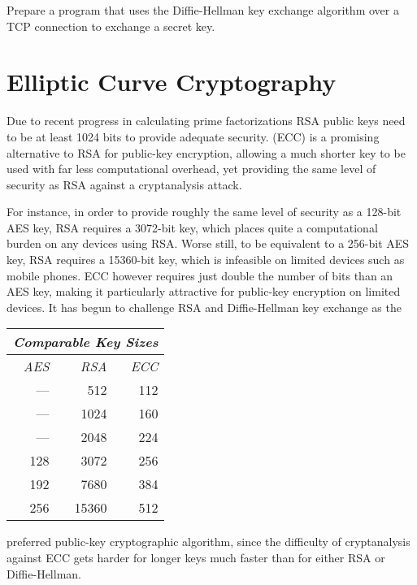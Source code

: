 \begin{exercise}
Prepare a program that uses the Diffie-Hellman key exchange algorithm over a
TCP connection to exchange a secret key.
\end{exercise}



\section{Elliptic Curve Cryptography}\label{Se:EllipticCurveCryptography}
Due to recent progress in calculating prime factorizations RSA public keys
need to be at least 1024 bits to provide adequate security.
 (ECC) is a promising alternative
to RSA for public-key encryption, allowing a much shorter key to be used
with far less computational overhead, yet providing the same level of security
as RSA against a cryptanalysis attack.

\noindent
\begin{minipage}{95mm}
  For instance, in order to provide roughly the same level of security as a
  128-bit AES key, RSA requires a 3072-bit key, which places quite a computational
  burden on any devices using RSA. Worse still, to be equivalent to
  a 256-bit AES key, RSA requires a 15360-bit key, which is infeasible on limited
  devices such as mobile phones. ECC however requires just double the number of bits
  than an AES key, making it particularly attractive for public-key encryption on limited devices. It has begun to challenge
  RSA and Diffie-Hellman key exchange as the
\end{minipage}
\hfill
\begin{tabular}{|r|r|r|} \hline
  \multicolumn{3}{|l|}{\textit{Comparable Key Sizes}} \\ \hline\hline
  \textit{AES} & \textit{RSA} & \textit{ECC} \\ \hline
  --- & 512 & 112 \\
  --- & 1024 & 160 \\
  --- & 2048 & 224 \\
  128 & 3072 & 256 \\
  192 & 7680 & 384 \\
  256 & 15360 & 512 \\\hline
\end{tabular}
preferred public-key cryptographic algorithm, since the difficulty of cryptanalysis against ECC gets harder for longer keys much faster than for either RSA or Diffie-Hellman.

